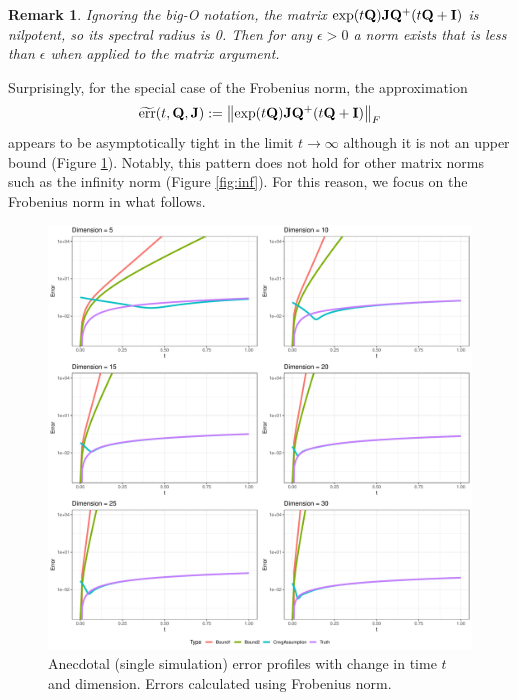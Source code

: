 \documentclass[12pt]{article} %
\newtheorem{remark}{Remark}
\begin{document}
\begin{remark}
Ignoring the big-O notation, the matrix $\exp(t\mathbf{Q}) \mathbf{J} \mathbf{Q}^+(t\mathbf{Q}+\mathbf{I})$ is nilpotent, so its spectral radius is 0.  Then for any $\epsilon>0$ a norm exists that is less than $\epsilon$ when applied to the matrix argument.
\end{remark}

Surprisingly, for the special case of the Frobenius norm, the approximation
\begin{align}
	\widetilde{\mbox{err}}(t,\mathbf{Q},\mathbf{J}) := \left\Vert \exp(t\mathbf{Q}) \mathbf{J} \mathbf{Q}^+(t\mathbf{Q}+\mathbf{I})  \right\Vert_F
\end{align}
appears to be asymptotically tight in the limit $t\rightarrow \infty$ although it is not an upper bound (Figure \ref{fig:frob}).  Notably, this pattern does not hold for other matrix norms such as the infinity norm (Figure \ref{fig:inf}).  For this reason, we focus on the Frobenius norm in what follows.



\begin{figure}[!p]
		\centering
	\includegraphics[width=\linewidth]{frobeniusScaling.pdf}
	\caption{Anecdotal (single simulation) error profiles with change in time $t$ and dimension. Errors calculated using Frobenius norm.}\label{fig:frob}
\end{figure}
\end{document}
